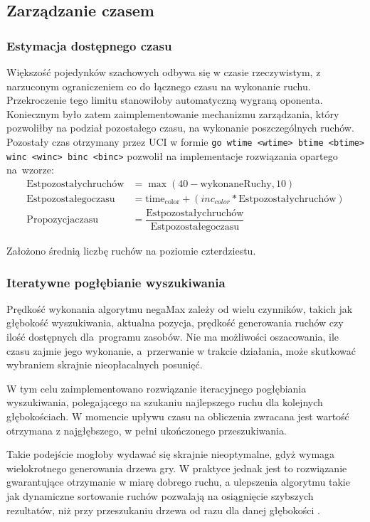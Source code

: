 \subsection{Zarządzanie czasem}
\label{subsec:zarzadzanie-czasem}
\subsubsection{Estymacja dostępnego czasu}
Większość pojedynków szachowych odbywa się w czasie rzeczywistym, z narzuconym ograniczeniem co do łącznego czasu na wykonanie ruchu.
Przekroczenie tego limitu stanowiłoby automatyczną wygraną oponenta.
Koniecznym było zatem zaimplementowanie mechanizmu zarządzania, który pozwoliłby na podział pozostałego czasu, na wykonanie poszczególnych ruchów.
Pozostały czas otrzymany przez UCI w formie \texttt{go wtime <wtime> btime <btime> winc <winc> binc <binc>} pozwolił na implementacje rozwiązania opartego na~wzorze:
\begin{align*}
    \mathrm{Est pozostałych ruchów} &= {\max(40 - \mathrm{wykonaneRuchy}, 10)} \\
    \mathrm{Est pozostałego czasu} &= \mathrm{time_{color}} + (inc_{color} * \mathrm{Est pozostałych ruchów}) \\
    \mathrm{Propozycja czasu} &= \dfrac{\mathrm{Est pozostałych ruchów}}{\mathrm{Est pozostałego czasu}}
\end{align*}

Założono średnią liczbę ruchów na poziomie czterdziestu.

\subsubsection{Iteratywne pogłębianie wyszukiwania}
Prędkość wykonania algorytmu negaMax zależy od wielu czynników, takich jak głębokość wyszukiwania, aktualna pozycja, prędkość generowania ruchów czy ilość dostępnych dla~programu zasobów.
Nie ma możliwości oszacowania, ile czasu zajmie jego wykonanie, a~przerwanie w trakcie działania, może skutkować wybraniem skrajnie nieopłacalnych posunięć.

W tym celu zaimplementowano rozwiązanie iteracyjnego pogłębiania wyszukiwania, polegającego na szukaniu najlepszego ruchu dla kolejnych głębokościach.
W momencie upływu czasu na obliczenia zwracana jest wartość otrzymana z najgłębszego, w pełni ukończonego przeszukiwania.

Takie podejście mogłoby wydawać się skrajnie nieoptymalne, gdyż wymaga wielokrotnego generowania drzewa gry.
W praktyce jednak jest to rozwiązanie gwarantujące otrzymanie w miarę dobrego ruchu, a ulepszenia algorytmu takie jak dynamiczne sortowanie ruchów pozwalają na osiągnięcie szybszych rezultatów, niż przy przeszukaniu drzewa od razu dla danej głębokości \cite*{wiki-deepening}.